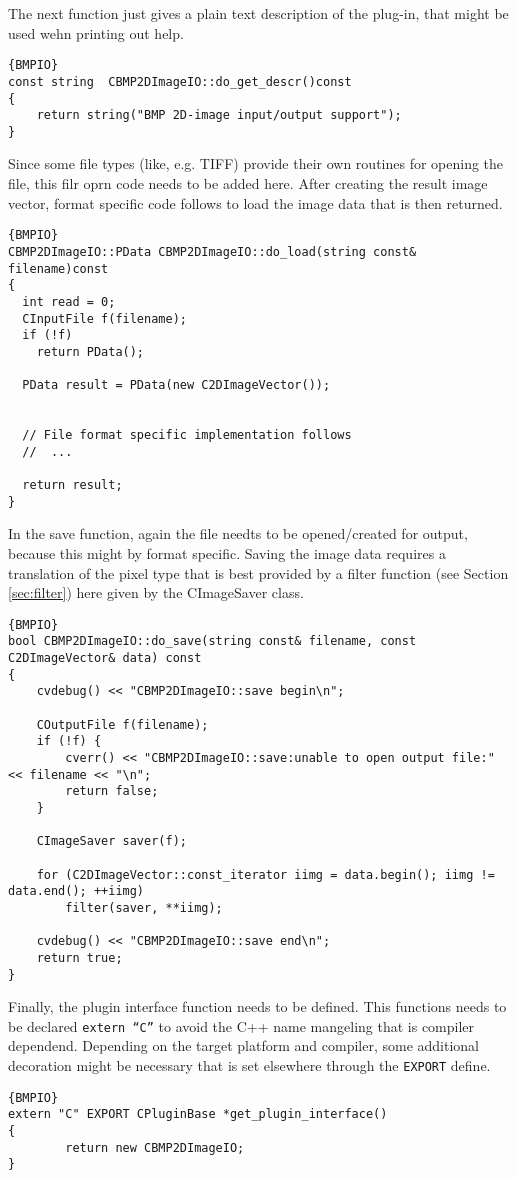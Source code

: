 \documentclass[english, 10pt, a4paper,headsepline,openany]{scrbook}
\begin{document}
\noindent 
The next function just gives a plain text description of the plug-in, that might be used wehn printing out help. 
\begin{lstlisting}{BMPIO}
const string  CBMP2DImageIO::do_get_descr()const
{
	return string("BMP 2D-image input/output support");
}
\end{lstlisting}

\noindent 
Since some file types (like, e.g. TIFF) provide their own routines for opening the file, this filr oprn code needs to be added here.
After creating the result image vector, format specific code follows to load the image data that is then returned. 
\begin{lstlisting}{BMPIO}
CBMP2DImageIO::PData CBMP2DImageIO::do_load(string const& filename)const
{
  int read = 0; 
  CInputFile f(filename);
  if (!f)
    return PData(); 

  PData result = PData(new C2DImageVector()); 

 
  // File format specific implementation follows
  //  ...
	
  return result; 
}
\end{lstlisting}

\noindent 
In the save function, again the file needts to be opened/created for output, because this might by format specific. 
Saving the image data requires a translation of the pixel type that is best provided by a filter function (see Section \ref{sec:filter}) here 
  given by the CImageSaver class.
\begin{lstlisting}{BMPIO}
bool CBMP2DImageIO::do_save(string const& filename, const C2DImageVector& data) const
{
	cvdebug() << "CBMP2DImageIO::save begin\n"; 
	
	COutputFile f(filename);
	if (!f) {
		cverr() << "CBMP2DImageIO::save:unable to open output file:" << filename << "\n"; 
		return false; 
	}
		
	CImageSaver saver(f); 
	
	for (C2DImageVector::const_iterator iimg = data.begin(); iimg != data.end(); ++iimg)
		filter(saver, **iimg); 
	
	cvdebug() << "CBMP2DImageIO::save end\n"; 
	return true; 
}
\end{lstlisting}

\noindent 
Finally, the plugin interface function needs to be defined. 
This functions needs to be declared \texttt{extern ``C''} to avoid the C++ name mangeling that is compiler dependend. 
Depending on the target platform and compiler, some additional decoration might be necessary that is set elsewhere 
  through the \texttt{EXPORT} define.
\begin{lstlisting}{BMPIO}
extern "C" EXPORT CPluginBase *get_plugin_interface()
{
		return new CBMP2DImageIO;
}
\end{lstlisting}
\end{document}
